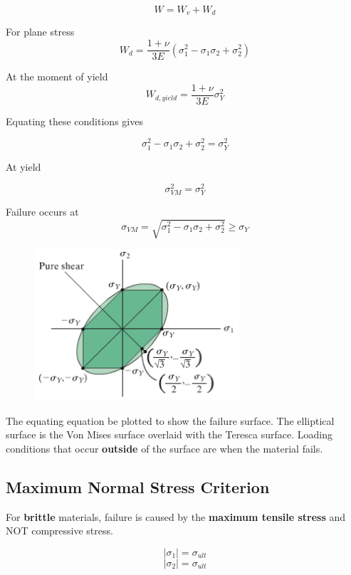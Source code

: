 \[W = W_v + W_d\]

\noindent For plane stress
\[W_d = \frac{1+\nu}{3E}(\sigma_1^2 - \sigma_1 \sigma_2 + \sigma_2^2)\]

\noindent At the moment of yield
\[W_{d,yield} = \frac{1+\nu}{3E}\sigma_Y^2\]

\noindent Equating these conditions gives

\[\sigma_1^2 - \sigma_1 \sigma_2 + \sigma_2^2 = \sigma_Y^2\]

\noindent At yield

\[\sigma_{VM}^2 = \sigma_Y^2\]

\noindent Failure occurs at
\[\sigma_{VM} = \sqrt{\sigma_1^2 - \sigma_1 \sigma_2 + \sigma_2^2} \ge \sigma_Y\]


\begin{figure}[!h]
\centering
\includegraphics[angle=0, width=3in]{Failure Theories-Figures/VonMisesSurface.png}
\vspace{-2mm}
\caption{\small {}}
\vspace{-3mm}
\label{Fig:VonMisesSurface}
\end{figure}

\noindent The equating equation be plotted to show the failure surface. The elliptical surface is the Von Mises surface overlaid with the Teresca surface. Loading conditions that occur \textbf{outside} of the surface are when the material fails.

\subsection{Maximum Normal Stress Criterion}

For \textbf{brittle} materials, failure is caused by the \textbf{maximum tensile stress} and NOT compressive stress.

\[|\sigma_1| = \sigma_{ult}\]
\[|\sigma_2| = \sigma_{ult}\]
 
